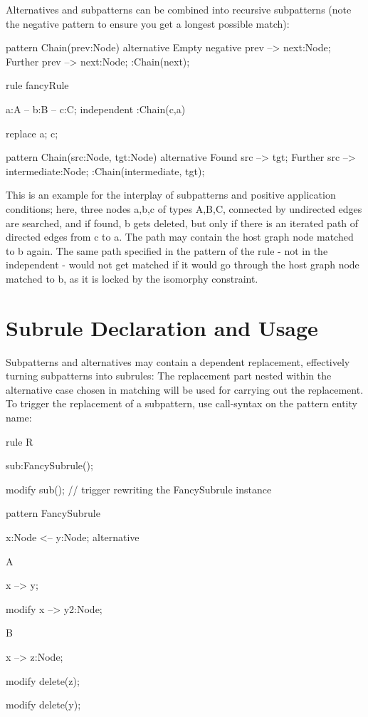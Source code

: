 Alternatives and subpatterns can be combined into recursive subpatterns
(note the negative pattern to ensure you get a longest possible match):

\begin{example}
  \begin{grgen}
pattern Chain(prev:Node) {
  alternative {
    Empty {
      negative {
        prev --> next:Node;
      }
    }
    Further {
      prev --> next:Node;
      :Chain(next);
    }
  }
}
  \end{grgen}
\end{example}

\begin{example}
  \begin{grgen}

rule fancyRule
{
  a:A -- b:B -- c:C;
  independent {
    :Chain(c,a)
  }
  
  replace {
    a; c;
  }
}

pattern Chain(src:Node, tgt:Node)
{
  alternative {
    Found {
      src --> tgt;
    }
    Further {
      src --> intermediate:Node;
      :Chain(intermediate, tgt);
    }
  }
}
  \end{grgen}

  This is an example for the interplay of subpatterns and positive application conditions; here, three nodes a,b,c of types A,B,C, connected by undirected edges are searched, and if found, b gets deleted, but only if there is an iterated path of directed edges from c to a. The path may contain the host graph node matched to b again. The same path specified in the pattern of the rule - not in the independent - would not get matched if it would go through the host graph node matched to b, as it is locked by the isomorphy constraint.

\end{example}


\section{Subrule Declaration and Usage}
\label{nac}

Subpatterns and alternatives may contain a dependent replacement, effectively
turning subpatterns into subrules:
The replacement part nested within the alternative case chosen in matching
will be used for carrying out the replacement. To trigger the replacement of a
subpattern, use call-syntax on the pattern entity name:

\begin{example}
  \begin{grgen}
rule R {
  sub:FancySubrule();

  modify {
    sub();        // trigger rewriting the FancySubrule instance
  }
}

pattern FancySubrule {
  x:Node <-- y:Node;
  alternative {
    A {
      x --> y;

      modify {
        x --> y2:Node;
      }
    }
    B {
      x --> z:Node;

      modify {
        delete(z);
      }
    }
  }

  modify {
    delete(y);
  }
}
  \end{grgen}
\end{example}

